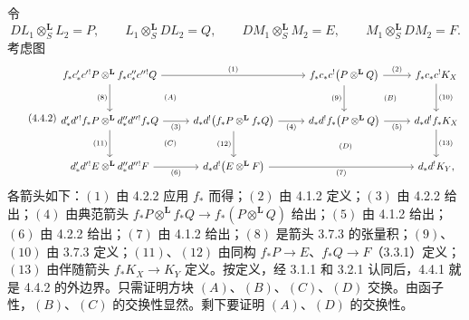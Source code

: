 \begin{prooftext}[证明]
令
\[
DL_1\otimes_S^{\mathbf L}L_2=P,\qquad
L_1\otimes_S^{\mathbf L}DL_2=Q,\qquad
DM_1\otimes_S^{\mathbf L}M_2=E,\qquad
M_1\otimes_S^{\mathbf L}DM_2=F.
\]
考虑图
\begin{equation}
\tag{4.4.2}
{
\begin{tikzcd}[column sep=2.6em,row sep=2.6em]
f_*c'_*c'{}^!P\otimes^{\mathbf L} f_*c''_*c''{}^!Q
  \arrow[rr,"(1)"] \arrow[d,"(8)"'] &&
f_*c_*c^!\bigl(P\otimes^{\mathbf L}Q\bigr)
  \arrow[r,"(2)"] \arrow[d,"(9)"'] &
f_*c_*c^!K_X \arrow[d,"(10)"]\\
d'_*d'{}^!f_*P\otimes^{\mathbf L}d''_*d''{}^!f_*Q
  \arrow[r,"(3)"'] \arrow[d,"(11)"'] &
d_*d^!\bigl(f_*P\otimes^{\mathbf L}f_*Q\bigr)
  \arrow[r,"(4)"'] \arrow[d,"(12)"'] &
d_*d^!f_*\bigl(P\otimes^{\mathbf L}Q\bigr)
  \arrow[r,"(5)"'] &
d_*d^!f_*K_X \arrow[d,"(13)"]\\
d'_*d'{}^!E\otimes^{\mathbf L}d''_*d''{}^!F
  \arrow[r,"(6)"'] &
d_*d^!\bigl(E\otimes^{\mathbf L}F\bigr)
  \arrow[rr,"(7)"'] &&
d_*d^!K_Y,
\arrow[from=1-1,to=2-2, phantom, "\scriptstyle (A)"]
\arrow[from=1-3,to=2-4, phantom, "\scriptstyle (B)"]
\arrow[from=2-1,to=3-2, phantom, "\scriptstyle (C)"]
\arrow[from=2-2,to=3-4, phantom, "\scriptstyle (D)"]
\end{tikzcd}
}
\end{equation}
各箭头如下：$(1)$ 由 4.2.2 应用 $f_*$ 而得；$(2)$ 由 4.1.2 定义；$(3)$ 由 4.2.2 给出；$(4)$ 由典范箭头 $f_*P\otimes^{\mathbf L}f_*Q\longrightarrow f_*(P\otimes^{\mathbf L}Q)$ 给出；$(5)$ 由 4.1.2 给出；$(6)$ 由 4.2.2 给出；$(7)$ 由 4.1.2 给出；$(8)$ 是箭头 3.7.3 的张量积；$(9)$、$(10)$ 由 3.7.3 定义；$(11)$、$(12)$ 由同构 $f_*P\longrightarrow E$、$f_*Q\longrightarrow F$（3.3.1）定义；$(13)$ 由伴随箭头 $f_*K_X\longrightarrow K_Y$ 定义。按定义，经 3.1.1 和 3.2.1 认同后，4.4.1 就是 4.4.2 的外边界。只需证明方块 $(A)$、$(B)$、$(C)$、$(D)$ 交换。由函子性，$(B)$、$(C)$ 的交换性显然。剩下要证明 $(A)$、$(D)$ 的交换性。


\end{prooftext}
